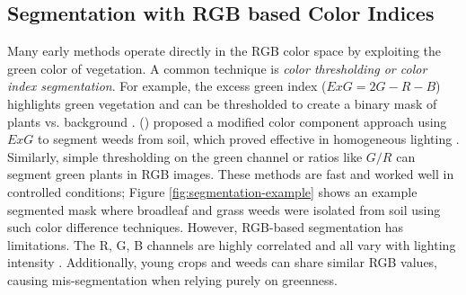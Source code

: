 \documentclass[letterpaper]{report}
\begin{document}
\subsection{Segmentation with RGB based Color Indices}  
Many early methods operate directly in the RGB color space by exploiting the green color of vegetation. A common technique is \textit{color thresholding or color index segmentation}. For example, the excess green index ($ExG = 2G - R - B$) highlights green vegetation and can be thresholded to create a binary mask of plants vs. background \parencite{Wu2021-gt}. \citeauthor{Tang2000-an} (\citeyear{Tang2000-an}) proposed a modified color component approach using $ExG$ to segment weeds from soil, which proved effective in homogeneous lighting \parencite{Tang2000-an}. Similarly, simple thresholding on the green channel or ratios like $G/R$ can segment green plants in RGB images. These methods are fast and worked well in controlled conditions; Figure \ref{fig:segmentation-example} shows an example segmented mask where broadleaf and grass weeds were isolated from soil using such color difference techniques. However, RGB-based segmentation has limitations. The R, G, B channels are highly correlated and all vary with lighting intensity \parencite{Wu2021-gt}. Additionally, young crops and weeds can share similar RGB values, causing mis-segmentation when relying purely on greenness.
\end{document}

